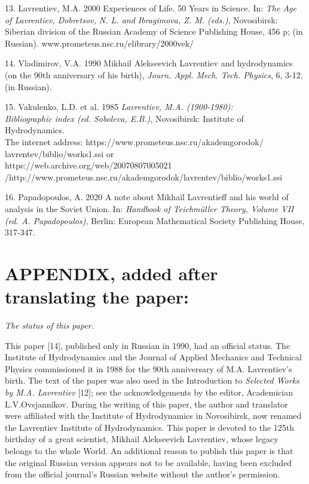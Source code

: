 \documentclass[%
 reprint,
onecolumn,
 amsmath,amssymb, aps,
]{revtex4-2}
\numberwithin{equation}{section}
\begin{document}
13.  Lavrentiev, M.A. 2000 Experiences of Life. 50 Years in Science. In: \textit{The Age of Lavrentiev, Dobretsov, N. L. and Ibragimova, Z. M. (eds.)}, Novosibirsk: Siberian division of the Russian Academy of Science Publishing House, 456 p; (in Russian).
www.prometeus.nsc.ru/elibrary/2000vek/

14. Vladimirov, V.A. 1990 Mikhail Alekseevich Lavrentiev and hydrodynamics (on the 90th anniversary of his birth), \textit{Journ. Appl. Mech. Tech. Physics}, 6, 3-12, (in Russian).

15. Vakulenko, L.D. et al. 1985 \textit{Lavrentiev, M.A. 
(1900-1980): \\ Bibliographic index (ed.  Soboleva, E.B.)}, Novosibirsk: Institute of Hydrodynamics.
\\The internet address: https://www.prometeus.nsc.ru/akademgorodok/ \\ lavrentev/biblio/works1.ssi or\\
https://web.archive.org/web/20070807005021\\
/http://www.prometeus.nsc.ru/akademgorodok/lavrentev/biblio/works1.ssi

16. Papadopoulos, A. 2020 A note about Mikhaïl Lavrentieff and his world of analysis in the Soviet Union. In: \textit{Handbook of Teichmüller Theory, Volume VII (ed. A. Papadopoulos)}, Berlin: European Mathematical Society Publishing House, 317-347.



\vspace{10mm}

\section{APPENDIX, added after translating the paper:}
\vspace{3mm}

\textit{The status of this paper.}
\vspace{1mm}


This paper [14], published only in Russian in 1990, had an official status.
The Institute of Hydrodynamics and the Journal of Applied Mechanics and Technical Physics commissioned it in 1988 for the 90th anniversary of M.A. Lavrentiev's birth.
The text of the paper was also used in the Introduction to \textit{Selected Works by M.A. Lavrentiev} [12]; see the acknowledgements by the editor, Academician L.V.Ovsjannikov.
During the writing of this paper, the author and translator were affiliated with the Institute of Hydrodynamics in Novosibirsk, now renamed the Lavrentiev Institute of Hydrodynamics.
This paper is devoted to the 125th birthday of a great scientist, Mikhail Alekseevich Lavrentiev, whose legacy belongs to the whole World.
An additional reason to publish this paper is that the original Russian version appears not to be available, having been excluded from the official journal's Russian website without the author's permission.
\end{document}
